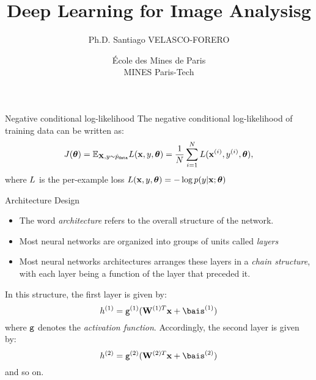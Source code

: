 \documentclass[xcolor=pdftex,dvipsnames,table]{beamer}
\title{Deep Learning for Image Analysisg}
\author{Ph.D. Santiago VELASCO-FORERO}
\date{ \'Ecole des Mines de Paris \\ MINES Paris-Tech}
\begin{document}
\begin{frame}
\titlepage
\end{frame}


\begin{frame}{Negative conditional log-likelihood}
The negative conditional log-likelihood of training data can be written as:
\begin{equation}
J(\boldsymbol{\theta})=\mathbb{E}_{\mathbf{X},y \sim \hat{p}_{\texttt{data}}} L(\mathbf{x},y,\boldsymbol{\theta}) = \frac{1}{N} \sum_{i=1}^{N} L(\mathbf{x}^{(i)},y^{(i)},\boldsymbol{\theta}),
\end{equation}
where $L$ is the per-example loss $L(\mathbf{x},y,\boldsymbol{\theta})=-\log p(y | \mathbf{x} ; \boldsymbol{\theta})$
\end{frame}

\begin{frame}{Architecture Design}
\begin{itemize}
\item The word \emph{architecture} refers to the overall structure of the network.
\item Most neural networks are organized into groups of units called \emph{layers}
\item Most neural networks architectures arranges these layers in a \emph{chain structure}, with each layer being a function of the layer that preceded it.
\end{itemize}
In this structure, the first layer is given by:
\begin{equation}
h^{(1)}=\act^{(1)} (\W^{(1)T}\x + \bais^{(1)})
\end{equation}
where $\texttt{g}$ denotes the \emph{activation function}.
Accordingly, the second layer is given by:
\begin{equation}
h^{(2)}=\act^{(2)} (\W^{(2)T}\x + \bais^{(2)})
\end{equation}
and so on.
\end{frame}
\end{document}
